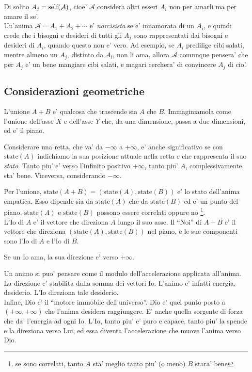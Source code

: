Di solito $A_j = \textrm{self}(\mathcal{A})$, cioe' $\mathcal{A}$ considera altri esseri $A_i$ non per amarli ma per amare il se'.\\

Un'anima $\mathcal{A}=A_1+A_2+\cdots$ e' \emph{narcisista} se e' innamorata di un $A_i$, e quindi crede che i bisogni e desideri di tutti gli $A_j$ sono rappresentati dai bisogni e desideri di $A_i$, quando questo non e' vero. Ad esempio, se $A_i$ predilige cibi salati, mentre almeno un $A_j$, distinto da $A_i$, non li ama, allora $\mathcal{A}$ comunque pensera' che per $A_j$ e' un bene mangiare cibi salati, e magari cerchera' di convincere $A_j$ di cio'.

\subsection{Considerazioni geometriche}
L'unione $A+B$ e' qualcosa che trascende sia $A$ che $B$. Immaginiamola come l'unione dell'asse $X$ e dell'asse $Y$ che, da una dimensione, passa a due dimensioni, ed e' il piano.

\def\state{\textrm{state}}

Considerare una retta, che va' da $-\infty$ a $+\infty$, e' anche significativo se con $\state(A)$ indichiamo la sua posizione attuale nella retta e che rappresenta il suo \emph{stato}. Tanto piu' e' verso l'infinito positivo $+\infty$, tanto piu' $A$, complessivamente, sta' bene. Viceversa, considerando $-\infty$.

Per l'unione, $\state(A+B)=(\state(A),\state(B))$ e' lo stato dell'anima empatica. Esso dipende sia da $\state(A)$ che da $\state(B)$ ed e' un punto del piano. $\state(A)$ e $\state(B)$ possono essere correlati oppure no \footnote{se sono correlati, tanto $A$ sta' meglio tanto piu' (o meno) $B$ stara' bene}.\\

L'Io di $A$ e' il vettore che direziona $A$ lungo il suo asse. Il ``Noi'' di $A+B$ e' il vettore che direziona $(\state(A),\state(B))$ nel piano, e le sue componenti sono l'Io di $A$ e l'Io di $B$.

Se un Io ama, la sua direzione e' verso $+\infty$.

Un animo si puo' pensare come il modulo dell'accelerazione applicata all'anima. La direzione e' stabilita dalla somma dei vettori Io. L'animo e' infatti energia, desiderio. L'Io direziona tale desiderio.\\

Infine, Dio e' il ``motore immobile dell'universo''. Dio e' quel punto posto a $(+\infty, +\infty)$ che l'anima desidera raggiungere. E' anche quella sorgente di forza che da' l'energia ad ogni Io. L'Io, tanto piu' e' puro e capace, tanto piu' la spende e la direziona verso Lui, ed essa diventa l'accelerazione che muove l'anima verso Dio.\\

